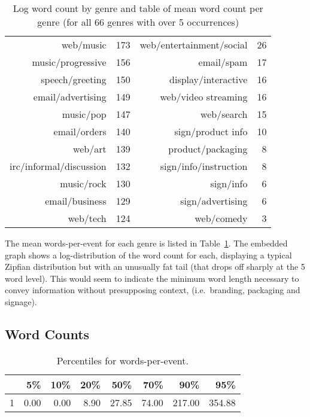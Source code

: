 \begin{table}[ht]
\begin{tabular}{r r || r r}
        web/music &  173  &  web/entertainment/social &   26 \\
        music/progressive &  156  &  email/spam &   17 \\
        speech/greeting &  150  &  display/interactive &   16 \\
        email/advertising &  149  &  web/video streaming &   16 \\
        music/pop &  147  &  web/search &   15 \\
        email/orders &  140  &  sign/product info &   10 \\
        web/art &  139  &  product/packaging &    8 \\
        irc/informal/discussion &  132  &  sign/info/instruction &    8 \\
        music/rock &  130 &  sign/info &    6 \\
        email/business &  129  & sign/advertising &    6 \\
        web/tech &  124  & web/comedy &    3 \\
        \hline
    \end{tabular}
    

    \label{fig:personal:genreworddist}
    \caption{Log word count by genre and table of mean word count per genre (for all 66 genres with over 5 occurrences)}
\end{table}

The mean words-per-event for each genre is listed in Table~\ref{fig:personal:genreworddist}.  The embedded graph shows a log-distribution of the word count for each, displaying a typical Zipfian distribution but with an unusually fat tail (that drops off sharply at the 5 word level).  This would seem to indicate the minimum word length necessary to convey information without presupposing context, (i.e.\ branding, packaging and signage).







\subsection{Word Counts}

\begin{table}[ht]
    \centering

    \begin{tabular}{|r|r|r|r|r|r|r|r|}
         \hline
         & 5\% & 10\% & 20\% & 50\% & 70\% & 90\% & 95\% \\ 
         \hline
         1 & 0.00 & 0.00 & 8.90 & 27.85 & 74.00 & 217.00 & 354.88 \\ 
         \hline
    \end{tabular}

    \caption{Percentiles for words-per-event.}
    \label{table:personal:wordsperevent}
\end{table}

